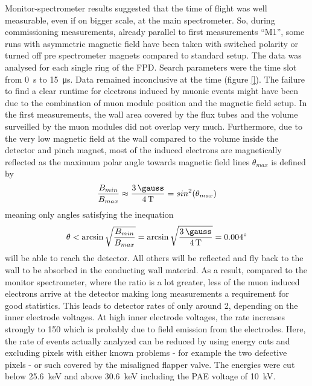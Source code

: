   Monitor-spectrometer results suggested that the time of flight was well measurable, even if on bigger scale, at the main spectrometer. So, during commissioning measurements, already parallel to first measurements ``M1'', some runs with asymmetric magnetic field have been taken with switched polarity or turned off pre spectrometer magnets compared to standard setup.
  The data was analysed for each single ring of the FPD. Search parameters were the time slot from \SI{0}{\second} to \SI{15}{\micro\second}. Data remained inconclusive at the time (figure \ref{}). 
  The failure to find a clear runtime for electrons induced by muonic events might have been due to the combination of muon module position and the magnetic field setup. In the first measurements, the wall area covered by the flux tubes and the volume surveilled by the muon modules did not overlap very much. Furthermore, due to the very low magnetic field at the wall compared to the volume inside the detector and pinch magnet, most of the induced electrons are magnetically reflected as the maximum polar angle towards magnetic field lines $\theta_{max}$ is defined by
  \begin{equation}
  	\frac{B_{min}}{B_{max}} \approx \frac{\SI{3}{\gauss}}{\SI{4}{\tesla}} = sin^2(\theta_{max})
  \end{equation}
  meaning only angles satisfying the inequation
  \begin{equation}
  	\theta < \arcsin{\sqrt{\frac{B_{min}}{B_{max}}}} = \arcsin{\sqrt{\frac{\SI{3}{\gauss}}{\SI{4}{\tesla}}}} = \SI{0.004}{\degree}
  \end{equation}
	will be able to reach the detector. All others will be reflected and fly back to the wall to be absorbed in the conducting wall material. 
	As a result, compared to the monitor spectrometer, where the ratio is a lot greater, less of the muon induced electrons arrive at the detector making long measurements a requirement for good statistics. This leads to detector rates of only around \SI{2}{\cps}, depending on the inner electrode voltages.
	At high inner electrode voltages, the rate increases strongly to \SI{150}{\cps} which is probably due to field emission from the electrodes. Here, the rate of events actually analyzed can be reduced by using energy cuts and excluding pixels with either known problems - for example the two defective pixels - or such covered by the misaligned flapper valve. The energies were cut below \SI{25.6}{\kilo\electronvolt} and above \SI{30.6}{\kilo\electronvolt} including the PAE voltage of \SI{10}{\kilo\volt}.
  
